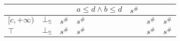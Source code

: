 \documentclass[aspectratio=169]{beamer}
\begin{document}
\begin{frame}
\begin{table}[]
{\begin{tabular}{|l|l|ll|ll|ll|l|}
                                        &                         &                            &                                & $a \le d \land b \le d$ & $s^\#$                   &                            &                                           &                                                 \\ \hline
        $[c, +\infty)$                  & $\bot_\mathbb{S}$                  & \multicolumn{2}{l|}{$s^\#$}                                 & \multicolumn{2}{l|}{$s^\#$}                        & \multicolumn{2}{l|}{$s^\#$}                                            & $s^\#$                                          \\ \hline
        $\top$                          & $\bot_\mathbb{S}$                  & \multicolumn{2}{l|}{$s^\#$}                                 & \multicolumn{2}{l|}{$s^\#$}                        & \multicolumn{2}{l|}{$s^\#$}                                            & $s^\#$                                          \\ \hline
        \end{tabular}}
        \end{table}
    \end{frame}
    
\end{document}
